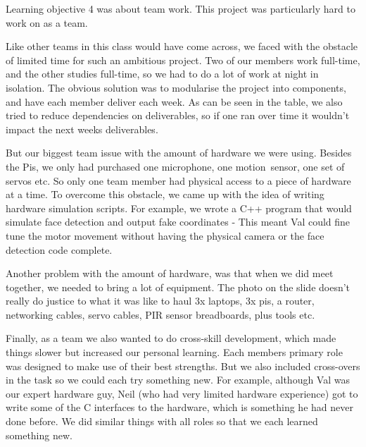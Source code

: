 \documentclass[11pt,a4paper,titlepage]{report}
\begin{document}
\begin{appendices}
Learning objective 4 was about team work. This project was particularly hard to work on as a team. 

Like other teams in this class would have come across, we faced with the obstacle of limited time for such an ambitious project. Two of our members work full-time, and the other studies full-time, so we had to do a lot of work at night in isolation. The obvious solution was to modularise the project into components, and have each member deliver each week. As can be seen in the table, we also tried to reduce dependencies on deliverables, so if one ran over time it wouldn’t impact the next weeks deliverables.

But our biggest team issue with the amount of hardware we were using. Besides the Pis, we only had purchased one microphone, one motion sensor, one set of servos etc. So only one team member had physical access to a piece of hardware at a time. To overcome this obstacle, we came up with the idea of writing hardware simulation scripts. For example, we wrote a C++ program that would simulate face detection and output fake coordinates - This meant Val could fine tune the motor movement without having the physical camera or the face detection code complete.

Another problem with the amount of hardware, was that when we did meet together, we needed to bring a lot of equipment. The photo on the slide doesn’t really do justice to what it was like to haul 3x laptops, 3x pis, a router, networking cables, servo cables, PIR sensor breadboards, plus tools etc.

Finally, as a team we also wanted to do cross-skill development, which made things slower but increased our personal learning. Each members primary role was designed to make use of their best strengths. But we also included cross-overs in the task so we could each try something new. For example, although Val was our expert hardware guy, Neil (who had very limited hardware experience) got to write some of the C interfaces to the hardware, which is something he had never done before. We did similar things with all roles so that we each learned something new.

\end{appendices}

\nocite{*}
\printbibliography[heading=bibintoc]
\end{document}
